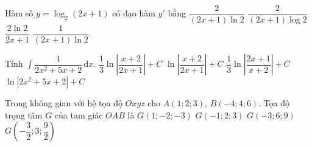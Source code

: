 \begin{ex}%
Hàm số $y=\log_2(2x+1)$ có đạo hàm $y'$ bằng
\choice
{\True $\dfrac{2}{(2x+1)\ln 2}$}
{$\dfrac{2}{(2x+1)\log 2}$}
{$\dfrac{2\ln 2}{2x+1}$}
{$\dfrac{1}{(2x+1)\ln 2}$}
\end{ex}

\begin{ex}%
Tính $\displaystyle\int\dfrac{1}{2x^2+5x+2}\mathrm{\,d}x$.
\choice
{$\dfrac{1}{3}\ln\left|\dfrac{x+2}{2x+1}\right|+C$}
{$\ln\left|\dfrac{x+2}{2x+1}\right|+C$}
{\True $\dfrac{1}{3}\ln\left|\dfrac{2x+1}{x+2}\right|+C$}
{$\ln\left|2x^2+5x+2\right|+C$}
\end{ex}

\begin{ex}%
Trong không gian với hệ tọa độ $Oxyz$ cho $A(1;2;3)$, $B(-4;4;6)$. Tọa độ trọng tâm $G$ của tam giác $OAB$ là
\choice
{$G(1;-2;-3)$}
{\True $G(-1;2;3)$}
{$G(-3;6;9)$}
{$G\left(-\dfrac{3}{2};3;\dfrac{9}{2}\right)$}

\end{ex}

